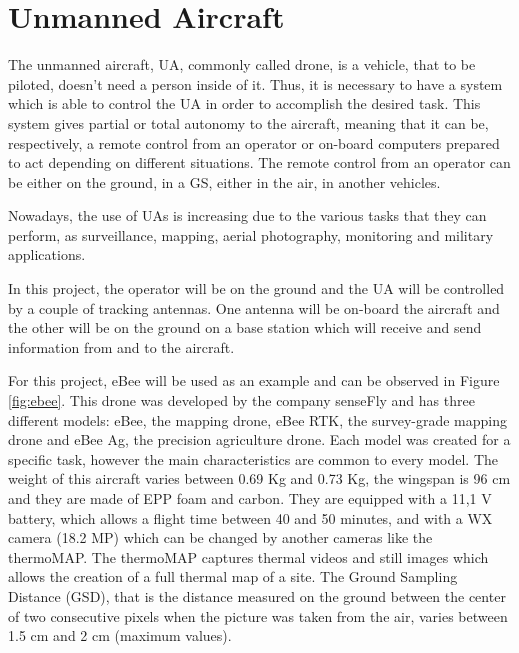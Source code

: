 \section{Unmanned Aircraft}\label{sec:drone}

The unmanned aircraft, UA, commonly called drone, is a vehicle, that to be piloted, doesn't need a person inside of it. Thus, it is necessary to have a system which is able to control the UA in order to accomplish the desired task. This system gives partial or total autonomy to the aircraft, meaning that it can be, respectively, a remote control from an operator or on-board computers prepared to act depending on different situations. The remote control from an operator can be either on the ground, in a GS, either in the air, in another vehicles.

Nowadays, the use of UAs is increasing due to the various tasks that they can perform, as surveillance, mapping, aerial photography, monitoring and military applications.

In this project, the operator will be on the ground and the UA will be controlled by a couple of tracking antennas. One antenna will be on-board the aircraft and the other will be on the ground on a base station which will receive and send information from and to the aircraft. 

For this project, eBee will be used as an example and can be observed in Figure \ref{fig:ebee}. This drone was developed by the company senseFly and has three different models: eBee, the mapping drone, eBee RTK, the survey-grade mapping drone and eBee Ag, the precision agriculture drone. Each model was created for a specific task, however the main characteristics are common to every model. The weight of this aircraft varies between 0.69 Kg and 0.73 Kg, the wingspan is 96 cm and they are made of EPP foam and carbon. They are equipped with a 11,1 V battery, which allows a flight time between 40 and 50 minutes, and with a WX camera (18.2 MP) which can be changed by another cameras like the thermoMAP. The thermoMAP captures thermal videos and still images which allows the creation of a full thermal map of a site. The Ground Sampling Distance (GSD), that is the distance measured on the ground between the center of two consecutive pixels when the picture was taken from the air, varies between 1.5 cm and 2 cm (maximum values). 
 
